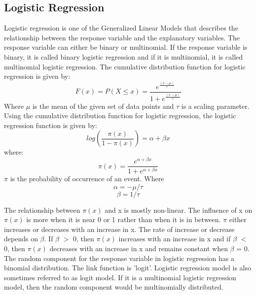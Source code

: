 \documentclass[sigconf]{acmart}
\begin{document}
\subsection{Logistic Regression}
Logistic regression is one of the Generalized Linear Models that describes the relationship between the response variable and the explanatory variables. The response variable can either be binary or multinomial. If the response variable is binary, it is called binary logistic regression and if it is multinomial, it is called multinomial logistic regression. 
The  cumulative distribution function for logistic regression is given by:
\begin{equation}
    F(x) = P(X \leq x) = \frac{e^{\frac{(x-\mu)}{\tau}}}{1+e^{\frac{(x-\mu)}{\tau}}}
\end{equation}
Where $\mu$ is the mean of the given set of data points and $\tau$ is a scaling parameter.\\
Using the cumulative distribution function for logistic regression, the logistic regression function is given by:
\begin{equation}
    log(\frac{\pi(x)}{1-\pi(x)}) = \alpha + \beta x
\end{equation}
where:
\begin{equation}
    \pi(x) = \frac{e^{\alpha+\beta x }}{1+e^{\alpha+\beta x }}
\end{equation}
$\pi$ is the probability of occurrence of an event. Where\\
\begin{equation}
    \alpha = -\mu/\tau
\end{equation}
\begin{equation}
    \beta = 1/\tau
\end{equation}

    

The relationship between $\pi(x)$ and x is mostly non-linear. The influence of x on $\pi(x)$ is more when it is near 0 or 1 rather than when it is in between. $\pi$ either increases or decreases with an increase in x. The rate of increase or decrease depends on $\beta$. If $\beta$ $>$ 0, then $\pi(x)$ increases with an increase in x and if $\beta$ $<$ 0, then $\pi(x)$ decreases with an increase in x and remains constant when $\beta$ = 0.\\
The random component for the response variable in logistic regression has a binomial distribution. The link function is 'logit'. Logistic regression model is also sometimes referred to as logit model. If it is a multinomial logistic regression model, then the random component would be multinomially distributed.
\end{document}
